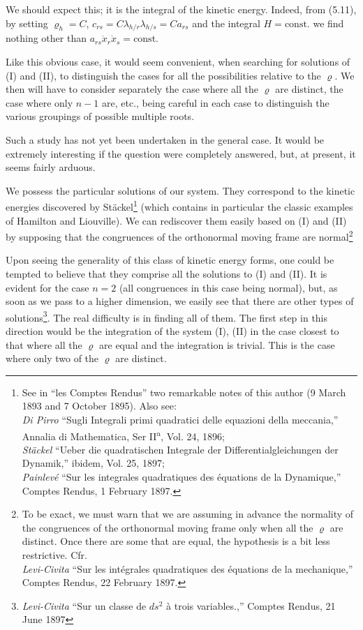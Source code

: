 \documentclass{book}
\begin{document}
We should expect this; it is the integral of the kinetic energy. Indeed, from (5.11), by setting $\varrho_h=C$, $c_{rs}=C\lambda_{h/r}\lambda_{h/s}=Ca_{rs}$ and the integral $H=\text{const.}$ we find nothing other than $a_{rs}\dot{x}_r\dot{x}_s=\text{const.}$

Like this obvious case, it would seem convenient, when searching for solutions of (I) and (II), to distinguish the cases for all the possibilities relative to the $\varrho$. We then will have to consider separately the case where all the $\varrho$ are distinct, the case where only $n-1$ are, etc., being careful in each case to distinguish the various groupings of possible multiple roots. %

Such a study has not yet been undertaken in the general case. It would be extremely interesting if the question were completely answered, but, at present, it seems fairly arduous. 

We possess the particular solutions of our system. They correspond to the kinetic energies discovered by St\"ackel\footnote{See in ``les Comptes Rendus'' two remarkable notes of this author (9 March 1893 and 7 October 1895). Also see:\\
\emph{Di Pirro} ``Sugli Integrali primi quadratici delle equazioni della meccania,'' Annalia di Mathematica, Ser II\textsuperscript{a}, Vol. 24, 1896;\\
\emph{St\"ackel} ``Ueber die quadratischen Integrale der Differentialgleichungen der Dynamik,'' ibidem, Vol. 25, 1897;\\
\emph{Painlev\'e} ``Sur les integrales quadratiques des \'equations de la Dynamique,'' Comptes Rendus, 1 February 1897.} (which contains in particular the classic examples of Hamilton and Liouville). We can rediscover them easily based on (I) and (II) by supposing that the congruences of the orthonormal moving frame are normal\footnote{To be exact, we must warn that we are assuming in advance the normality of the congruences of the orthonormal moving frame only when all the $\varrho$ are distinct. Once there are some that are equal, the hypothesis is a bit less restrictive. Cfr.\\
\emph{Levi-Civita} ``Sur les int\'egrales quadratiques des \'equations de la mechanique,'' Comptes Rendus, 22 February 1897.}

Upon seeing the generality of this class of kinetic energy forms, one could be tempted to believe that they comprise all the solutions to (I) and (II). It is evident for the case $n=2$ (all congruences in this case being normal), but, as soon as we pass to a higher dimension, we easily see that there are other types of solutions\footnote{\emph{Levi-Civita} ``Sur un classe de $ds^2$ \`a trois variables.,'' Comptes Rendus, 21 June 1897}. The real difficulty is in finding all of them. The first step in this direction would be the integration of the system (I), (II) in the case closest to that where all the $\varrho$ are equal and the integration is trivial. This is the case where only two of the $\varrho$ are distinct. 
\end{document}
